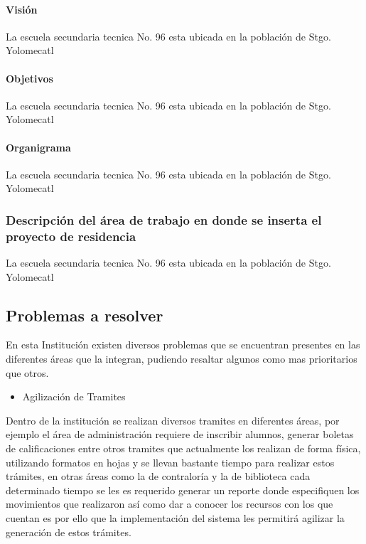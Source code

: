 \paragraph{Visión}

{\large La escuela secundaria tecnica No. 96 esta ubicada en la población de Stgo. Yolomecatl}\\

\paragraph{Objetivos}

{\large La escuela secundaria tecnica No. 96 esta ubicada en la población de Stgo. Yolomecatl}\\

\paragraph{Organigrama}

{\large La escuela secundaria tecnica No. 96 esta ubicada en la población de Stgo. Yolomecatl}\\

\subsubsection{Descripción del área de trabajo en donde se inserta el proyecto de residencia}

{\large La escuela secundaria tecnica No. 96 esta ubicada en la población de Stgo. Yolomecatl}\\

\subsection{Problemas a resolver}

{\large En esta Institución existen diversos problemas que se encuentran presentes en las diferentes áreas que la integran, pudiendo resaltar algunos como mas prioritarios que otros.}\\

\begin{itemize}
\item Agilización de Tramites
\end{itemize}
{\large Dentro de la institución se realizan diversos tramites en diferentes áreas, por ejemplo el área de administración requiere de inscribir alumnos, generar boletas de calificaciones entre otros tramites que actualmente los realizan de forma física, utilizando formatos en hojas y se llevan bastante tiempo para realizar estos trámites, en otras áreas como la de contraloría y la de biblioteca cada determinado tiempo se les es requerido generar un reporte donde especifiquen los movimientos que realizaron así como dar a conocer los recursos con los que cuentan es por ello que la implementación del sistema les permitirá agilizar la generación de estos trámites.}\\

